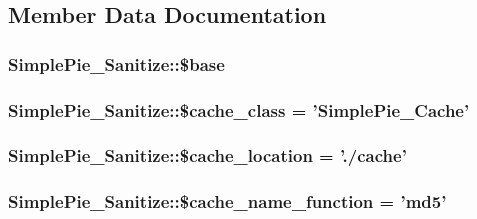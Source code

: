 \subsection{Member Data Documentation}
\hypertarget{class_simple_pie___sanitize_a76a01a0e635a14b6b3749478b6d7b4bd}{
\subsubsection[{\$base}]{\setlength{\rightskip}{0pt plus 5cm}Simple\-Pie\-\_\-\-Sanitize\-::\$base}}\label{class_simple_pie___sanitize_a76a01a0e635a14b6b3749478b6d7b4bd}
\hypertarget{class_simple_pie___sanitize_ac7834fd8c1dc4a81d98f0dc1589cb005}{
\subsubsection[{\$cache\-\_\-class}]{\setlength{\rightskip}{0pt plus 5cm}Simple\-Pie\-\_\-\-Sanitize\-::\$cache\-\_\-class = '{\bf Simple\-Pie\-\_\-\-Cache}'}}\label{class_simple_pie___sanitize_ac7834fd8c1dc4a81d98f0dc1589cb005}
\hypertarget{class_simple_pie___sanitize_a86db59fda2b811cdb28fb8e032d33431}{
\subsubsection[{\$cache\-\_\-location}]{\setlength{\rightskip}{0pt plus 5cm}Simple\-Pie\-\_\-\-Sanitize\-::\$cache\-\_\-location = './cache'}}\label{class_simple_pie___sanitize_a86db59fda2b811cdb28fb8e032d33431}
\hypertarget{class_simple_pie___sanitize_a5303322abff16ce8a4cd3950aa470b83}{
\subsubsection[{\$cache\-\_\-name\-\_\-function}]{\setlength{\rightskip}{0pt plus 5cm}Simple\-Pie\-\_\-\-Sanitize\-::\$cache\-\_\-name\-\_\-function = 'md5'}}\label{class_simple_pie___sanitize_a5303322abff16ce8a4cd3950aa470b83}
